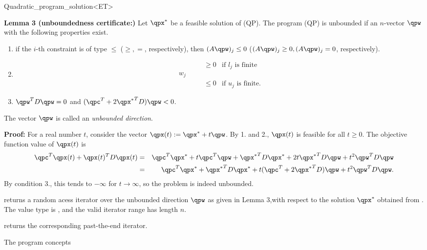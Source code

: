 \begin{ccRefClass}{Quadratic_program_solution<ET>}
\begin{ccAdvanced}
{\bf Lemma 3 (unboundedness certificate:)} Let $\qpx^*$ be a feasible
solution of (QP). The program (QP) is unbounded if an $n$-vector 
$\qpw$ with the following properties exist.
\begin{enumerate}
\item if the $i$-th constraint is of type $\leq$ ($\geq, =$, respectively),
then $(A\qpw)_j\leq 0$ ($(A\qpw)_j\geq 0, (A\qpw)_j=0$, respectively).
\item 
\[
\begin{array}{llll}
&&\geq 0 & \mbox{if $l_j$ is finite} \\
w_j &\quad  \\
&&\leq 0 & \mbox{if $u_j$ is finite.}
\end{array}
\]
\item $\qpw^TD\qpw=0$ and $(\qpc^T+2{\qpx^*}^TD)\qpw<0$.
\end{enumerate}

The vector $\qpw$ is called an \emph{unbounded direction}.

{\bf Proof:} For a real number $t$, consider the vector $\qpx(t):=\qpx^*+t\qpw$. By 1.
and 2., $\qpx(t)$ is feasible for all $t\geq 0$. The objective function value
of $\qpx(t)$ is
\begin{eqnarray*}
\qpc^T \qpx(t) + \qpx(t)^TD \qpx(t) &=& 
\qpc^T\qpx^* + t\qpc^T\qpw + {\qpx^*}^TD\qpx^* +  2t{\qpx^*}^TD\qpw + t^2 \qpw^TD\qpw  \\
&=& \qpc^T\qpx^* + {\qpx^*}^TD\qpx^* + t(\qpc^T + 2{\qpx^*}^TD)\qpw + t^2\qpw^TD\qpw.
\end{eqnarray*}
By condition 3., this tends to $-\infty$ for $t\rightarrow\infty$, so
the problem is indeed unbounded. 

{returns a random acess iterator over the unbounded direction $\qpw$
as given in Lemma 3,with respect to the solution $\qpx^*$ 
obtained from \ccVar{}. The value type
is , and the valid iterator range has length $n$.
\ccPrecond \ccVar{}}

{returns the corresponding past-the-end iterator.}
\ccExample
{}

\end{ccAdvanced}

\ccSeeAlso

The program concepts 


\end{ccRefClass}
